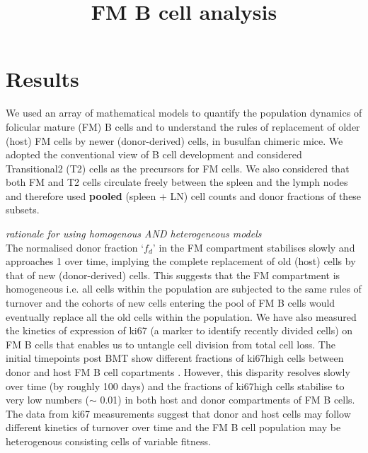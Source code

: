 \documentclass[11.5pt]{article}
\title{FM B cell analysis}
\author{}
\date{}
\begin{document}
 
\maketitle

\section*{Results} 
We used an array of mathematical models to quantify the population dynamics of folicular mature (FM) B cells and to understand the rules of replacement of older (host) FM cells by newer (donor-derived) cells, in busulfan chimeric mice.
We adopted the conventional view of B cell development and considered Transitional2 (T2) cells as the precursors for FM cells.
We also considered that both FM and T2 cells circulate freely between the spleen and the lymph nodes and therefore used \textbf{pooled} (spleen + LN) cell counts and donor fractions of these subsets. 


\textit{rationale for using homogenous AND heterogeneous models}\\
The normalised donor fraction `$f_{d}$' in the FM compartment stabilises slowly and approaches 1 over time, implying the complete replacement of old (host) cells by that of new (donor-derived) cells.
This suggests that the FM compartment is homogeneous i.e. all cells within the population are subjected to the same rules of turnover and the cohorts of new cells entering the pool of FM B cells would eventually replace all the old cells within the population.
We have also measured the kinetics of expression of ki67 (a marker to identify recently divided cells) on FM B cells that enables us to untangle cell division from total cell loss. 
The initial timepoints post BMT show different fractions of ki67high cells between donor and host FM B cell copartments .
However, this disparity resolves slowly over time (by roughly 100 days) and the fractions of ki67high cells stabilise to very low numbers ($\sim$ 0.01) in both host and donor compartments of FM B cells. 
The data from ki67 measurements suggest that donor and host cells may follow different kinetics of turnover over time and the FM B cell population may be heterogenous consisting cells of variable fitness. 
\end{document}
